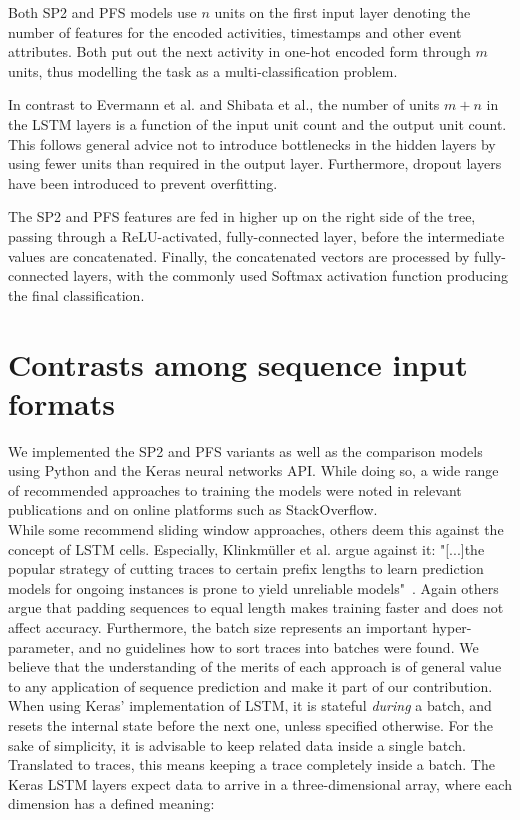 Both SP2 and PFS models use $n$ units on the first input layer denoting the number of features for the encoded activities, timestamps and other event attributes. Both put out the next activity in one-hot encoded form through $m$ units, thus modelling the task as a multi-classification problem.

In contrast to Evermann et al. and Shibata et al., the number of units $m+n$ in the LSTM layers is a function of the input unit count and the output unit count. This follows general advice not to introduce bottlenecks in the hidden layers by using fewer units than required in the output layer. Furthermore, dropout layers have been introduced to prevent overfitting.

The SP2 and PFS features are fed in higher up on the right side of the tree, passing through a ReLU-activated, fully-connected layer, before the intermediate values are concatenated. Finally, the concatenated vectors are processed by fully-connected layers, with the commonly used Softmax activation function producing the final classification.

\section{Contrasts among sequence input formats}
\label{sec:contrib:input-formatting}
We implemented the SP2 and PFS variants as well as the comparison models using Python and the Keras neural networks API. While doing so, a wide range of recommended approaches to training the models were noted in relevant publications and on online platforms such as StackOverflow.\\

While some recommend sliding window approaches, others deem this against the concept of LSTM cells. Especially, Klinkmüller et al. argue against it: "[...]the popular strategy of cutting traces to certain prefix lengths to learn prediction models for ongoing instances is prone to yield unreliable models"~\cite{klinkmuller2018reliablemonitoring}. Again others argue that padding sequences to equal length makes training faster and does not affect accuracy. Furthermore, the batch size represents an important hyper-parameter, and no guidelines how to sort traces into batches were found. We believe that the understanding of the merits of each approach is of general value to any application of sequence prediction and make it part of our contribution.\\

When using Keras' implementation of LSTM, it is stateful \textit{during} a batch, and resets the internal state before the next one, unless specified otherwise. For the sake of simplicity, it is advisable to keep related data inside a single batch. Translated to traces, this means keeping a trace completely inside a batch. The Keras LSTM layers expect data to arrive in a three-dimensional array, where each dimension has a defined meaning:


